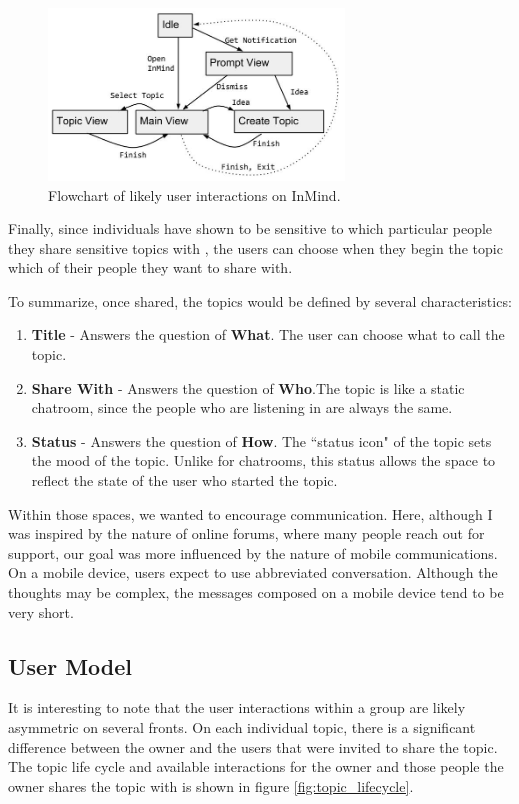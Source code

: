   \begin{figure}
  \centering
  \includegraphics[width=0.7\textwidth]{user_interaction.jpg}
  \caption{Flowchart of likely user interactions on InMind.}
  \label{fig:user_interaction}
  \end{figure}

  Finally, since individuals have shown to be sensitive
  to which particular people they share
  sensitive topics with \cite{patil05},
  the users can choose when they begin the topic
  which of their people they want to share with.

  To summarize, once shared, the topics would be defined by several characteristics:

  \begin{enumerate}
  \item \textbf{Title} - Answers the question of \textbf{What}. The user can choose what to call the topic.
  \item \textbf{Share With} - Answers the question of \textbf{Who}.The topic is like a static chatroom,
    since the people who are listening in are always the same.
  \item \textbf{Status} - Answers the question of \textbf{How}. The ``status icon" of the topic sets the mood
    of the topic. Unlike for chatrooms,
    this status allows the space to reflect the state
    of the user who started the topic.
  \end{enumerate}

  Within those spaces, we wanted to encourage communication.
  Here, although I was inspired by the nature of online forums,
  where many people reach out for support,
  our goal was more influenced by the nature of mobile communications.
  On a mobile device, users expect to use abbreviated conversation.
  Although the thoughts may be complex, the messages composed on a mobile device
  tend to be very short.

    \subsection{User Model}
      It is interesting to note that the user interactions within a group
      are likely asymmetric on several fronts.
      On each individual topic, there is a significant difference between the owner
      and the users that were invited to share the topic.
      The topic life cycle and available interactions for the owner
      and those people the owner shares the topic with
      is shown in figure \ref{fig:topic_lifecycle}.

